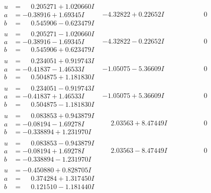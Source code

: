 \documentclass[1p]{elsarticle_modified}
\theoremstyle{definition}
\begin{document}
$$\begin{array}{c|c|c}
\begin{aligned}
u &= \phantom{-}0.205271 + 1.020660 I \\
a &= -0.38916 + 1.69345 I \\
b &= \phantom{-}0.545906 - 0.623479 I\end{aligned}
 & -4.32822 + 0.22652 I & \phantom{-0.000000 } 0 \\ \hline\begin{aligned}
u &= \phantom{-}0.205271 - 1.020660 I \\
a &= -0.38916 - 1.69345 I \\
b &= \phantom{-}0.545906 + 0.623479 I\end{aligned}
 & -4.32822 - 0.22652 I & \phantom{-0.000000 } 0 \\ \hline\begin{aligned}
u &= \phantom{-}0.234051 + 0.919743 I \\
a &= -0.41837 - 1.46533 I \\
b &= \phantom{-}0.504875 + 1.181830 I\end{aligned}
 & -1.05075 - 5.36609 I & \phantom{-0.000000 } 0 \\ \hline\begin{aligned}
u &= \phantom{-}0.234051 - 0.919743 I \\
a &= -0.41837 + 1.46533 I \\
b &= \phantom{-}0.504875 - 1.181830 I\end{aligned}
 & -1.05075 + 5.36609 I & \phantom{-0.000000 } 0 \\ \hline\begin{aligned}
u &= \phantom{-}0.083853 + 0.943879 I \\
a &= -0.08194 - 1.69278 I \\
b &= -0.338894 + 1.231970 I\end{aligned}
 & \phantom{-}2.03563 + 8.47449 I & \phantom{-0.000000 } 0 \\ \hline\begin{aligned}
u &= \phantom{-}0.083853 - 0.943879 I \\
a &= -0.08194 + 1.69278 I \\
b &= -0.338894 - 1.231970 I\end{aligned}
 & \phantom{-}2.03563 - 8.47449 I & \phantom{-0.000000 } 0 \\ \hline\begin{aligned}
u &= -0.450880 + 0.828705 I \\
a &= \phantom{-}0.374284 + 1.317450 I \\
b &= \phantom{-}0.121510 - 1.181440 I\end{aligned}

\end{array}$$
\end{document}
